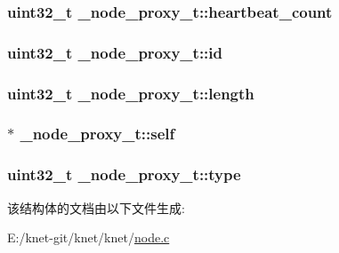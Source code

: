 \subsubsection[{heartbeat\+\_\+count}]{\setlength{\rightskip}{0pt plus 5cm}uint32\+\_\+t \+\_\+node\+\_\+proxy\+\_\+t\+::heartbeat\+\_\+count}\label{a00040_a619c9d4da80b0712c2c72e8e84380ff4_a619c9d4da80b0712c2c72e8e84380ff4}
\hypertarget{a00040_a56ff76512a6cfe92d51971ccdd7f88fa_a56ff76512a6cfe92d51971ccdd7f88fa}{}
\subsubsection[{id}]{\setlength{\rightskip}{0pt plus 5cm}uint32\+\_\+t \+\_\+node\+\_\+proxy\+\_\+t\+::id}\label{a00040_a56ff76512a6cfe92d51971ccdd7f88fa_a56ff76512a6cfe92d51971ccdd7f88fa}
\hypertarget{a00040_a9031cd4ac9c1b7afae561b1e3e13d84c_a9031cd4ac9c1b7afae561b1e3e13d84c}{}
\subsubsection[{length}]{\setlength{\rightskip}{0pt plus 5cm}uint32\+\_\+t \+\_\+node\+\_\+proxy\+\_\+t\+::length}\label{a00040_a9031cd4ac9c1b7afae561b1e3e13d84c_a9031cd4ac9c1b7afae561b1e3e13d84c}
\hypertarget{a00040_a5793ea18f46f0d0cf0ce003904467c6f_a5793ea18f46f0d0cf0ce003904467c6f}{}
\subsubsection[{self}]{$\ast$ \+\_\+node\+\_\+proxy\+\_\+t\+::self}\label{a00040_a5793ea18f46f0d0cf0ce003904467c6f_a5793ea18f46f0d0cf0ce003904467c6f}
\hypertarget{a00040_a4535368a55e887db9cd48723457416f6_a4535368a55e887db9cd48723457416f6}{}
\subsubsection[{type}]{\setlength{\rightskip}{0pt plus 5cm}uint32\+\_\+t \+\_\+node\+\_\+proxy\+\_\+t\+::type}\label{a00040_a4535368a55e887db9cd48723457416f6_a4535368a55e887db9cd48723457416f6}


该结构体的文档由以下文件生成\+:\begin{DoxyCompactItemize}
\item 
E\+:/knet-\/git/knet/knet/\hyperlink{a00101}{node.\+c}\end{DoxyCompactItemize}
